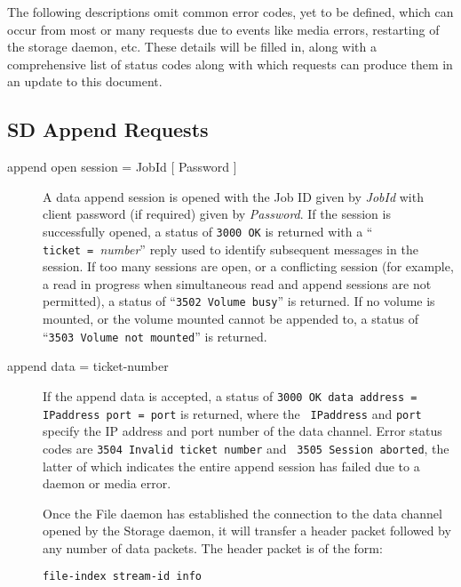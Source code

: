The following descriptions omit common error codes, yet to be defined, which
can occur from most or many requests due to events like media errors,
restarting of the storage daemon, etc. These details will be filled in, along
with a comprehensive list of status codes along with which requests can
produce them in an update to this document. 

\subsection{SD Append Requests}

\begin{description}

\item [{append open session = \lt{}JobId\gt{} [  \lt{}Password\gt{} ]  }]
   A data append session is opened with the Job ID given by  {\it JobId} with
client password (if required) given by {\it Password}.  If the session is
successfully opened, a status of {\tt 3000\ OK} is  returned with a ``{\tt
ticket\ =\ }{\it number}'' reply used to  identify subsequent messages in the
session. If too many sessions are open, or  a conflicting session (for
example, a read in progress when simultaneous read  and append sessions are
not permitted), a status of  ``{\tt 3502\ Volume\ busy}'' is returned. If no
volume is mounted, or  the volume mounted cannot be appended to, a status of 
``{\tt 3503\ Volume\ not\ mounted}'' is returned.  

\item [append data = \lt{}ticket-number\gt{}  ]
   If the append data is accepted, a  status of {\tt 3000\ OK data address =
\lt{}IPaddress\gt{} port = \lt{}port\gt{}} is returned,  where the {\tt
IPaddress} and {\tt port} specify the IP address and  port number of the data
channel. Error status codes are  {\tt 3504\ Invalid\ ticket\ number} and  {\tt
3505\ Session\ aborted}, the latter of which indicates the  entire append
session has failed due to a daemon or media error.  

Once the File daemon has established the connection to the data channel 
opened by the Storage daemon, it will transfer a header packet followed  by
any number of data packets. The header packet is of the form:  

{\tt \lt{}file-index\gt{} \lt{}stream-id\gt{} \lt{}info\gt{}}  


\end{description}
